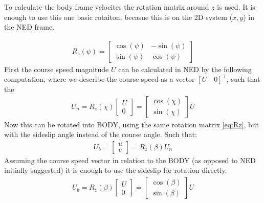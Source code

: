 To calculate the body frame velocites the rotation matrix around $z$ is used. It is enough to use this one basic rotaiton, becasue this is on the 2D system ($x,y$) in the \ac{NED} frame.

\begin{align}
R_{z} (\psi) =
\begin{bmatrix}
\cos(\psi) & -\sin(\psi)\\
\sin(\psi) & \cos(\psi)
\end{bmatrix}
\label{eq:Rz}
\end{align}
First the course speed magnitude $U$ can be calculated in \ac{NED} by the following computation, where we describe the course speed as a vector $[U\quad 0]^\top$, such that the 
\begin{align}
U_n = R_{z} (\chi)
\begin{bmatrix}
U \\ 0 
\end{bmatrix}
=
\begin{bmatrix}
\cos(\chi) \\
\sin(\chi)
\end{bmatrix}
U
\end{align}
Now this can be rotated into \ac{BODY}, using the same rotation matrix \vref{eq:Rz}, but with the sideslip angle instead of the course angle. Such that:
\begin{align}
U_b = \begin{bmatrix}
u \\ v
\end{bmatrix}
= R_z (\beta) U_n
\end{align}
Assuming the course speed vector in relation to the \ac{BODY} (as opposed to \ac{NED} initially suggested) it is enough to use the sideslip for rotation directly.
\begin{align}
U_b = R_{z} (\beta)
\begin{bmatrix}
U \\ 0 
\end{bmatrix}
=
\begin{bmatrix}
\cos(\beta) \\
\sin(\beta)
\end{bmatrix}
U
\end{align}

